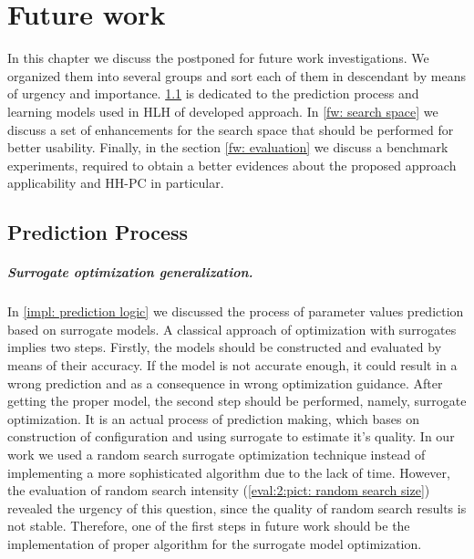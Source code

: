 \chapter{Future work}\label{future work}
In this chapter we discuss the postponed for future work investigations. We organized them into several groups and sort each of them in descendant by means of urgency and importance. \cref{fw: prediction process} is dedicated to the prediction process and learning models used in HLH of developed approach. In \cref{fw: search space} we discuss a set of enhancements for the search space that should be performed for better usability. Finally, in the section \cref{fw: evaluation} we discuss a benchmark experiments, required to obtain a better evidences about the proposed approach applicability and HH-PC in particular.


\section{Prediction Process}\label{fw: prediction process}
\paragraph{Surrogate optimization generalization.} In \cref{impl: prediction logic} we discussed the process of parameter values prediction based on surrogate models. A classical approach of optimization with surrogates implies two steps. Firstly, the models should be constructed and evaluated by means of their accuracy. If the model is not accurate enough, it could result in a wrong prediction and as a consequence in wrong optimization guidance. After getting the proper model, the second step should be performed, namely, surrogate optimization. It is an actual process of prediction making, which bases on construction of configuration and using surrogate to estimate it's quality. In our work we used a random search surrogate optimization technique instead of implementing a more sophisticated algorithm due to the lack of time. However, the evaluation of random search intensity (\cref{eval:2:pict: random search size}) revealed the urgency of this question, since the quality of random search results is not stable. Therefore, one of the first steps in future work should be the implementation of proper algorithm for the surrogate model optimization.


